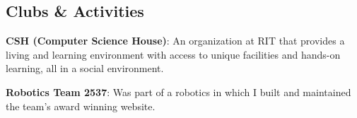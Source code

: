 \documentclass[a4paper,margin,line]{resume}
\begin{document}
\begin{resume}
\section{\mysidestyle Clubs \& Activities}
    \begin{asparablank}
        \item \textbf{CSH (Computer Science House)}: An organization at RIT that 
            provides a living and learning environment with access to unique facilities
            and hands-on learning, all in a social environment.
        \\
        \item \textbf{Robotics Team 2537}: Was part of a robotics in which I built and
            maintained the team's award winning website.
    \end{asparablank}

\end{resume}
\end{document}
